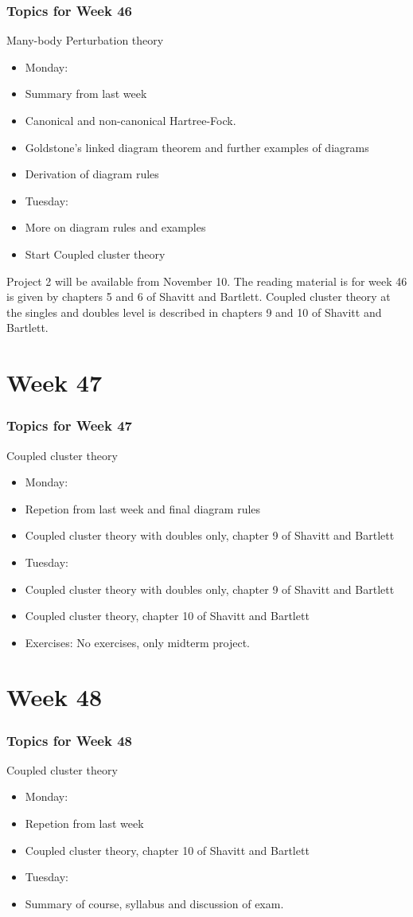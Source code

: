 \frame
{
  \frametitle{Topics for Week 46}
  \begin{block}{Many-body Perturbation theory}
\begin{itemize}
\item Monday:
\item Summary from last week
\item Canonical and non-canonical Hartree-Fock.  
\item Goldstone's linked diagram theorem and further examples of diagrams
\item Derivation of diagram rules
\item Tuesday:
\item More on diagram rules and examples
\item Start Coupled cluster theory
\end{itemize}
Project 2 will be available from November 10.  The reading material is for week 46 is given by chapters 5 and 6 of Shavitt and Bartlett.  Coupled cluster theory at the singles and doubles level is described in chapters 9 and 10 of Shavitt and Bartlett. 
  \end{block}
} 

\section{Week 47}
\frame
{
  \frametitle{Topics for Week 47}
  \begin{block}{Coupled cluster theory}
\begin{itemize}
\item Monday:
\item Repetion from last week and final diagram rules
\item Coupled cluster theory with doubles only, chapter 9 of Shavitt and Bartlett
\item Tuesday:
\item Coupled cluster theory with doubles only, chapter 9 of Shavitt and Bartlett
\item Coupled cluster theory, chapter 10 of Shavitt and Bartlett
\item Exercises:  No exercises, only midterm project. 
\end{itemize}
  \end{block}
} 



\section{Week 48}
\frame
{
  \frametitle{Topics for Week 48}
  \begin{block}{Coupled cluster theory}
\begin{itemize}
\item Monday:
\item Repetion from last week
\item Coupled cluster theory, chapter 10 of Shavitt and Bartlett
\item Tuesday:
\item Summary of course, syllabus and discussion of exam.
\end{itemize}
  \end{block}
} 


